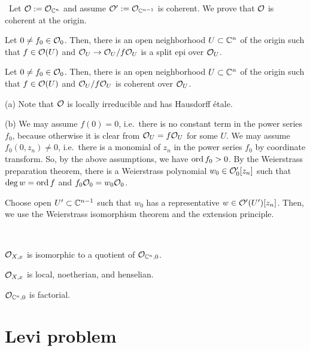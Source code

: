 \documentclass{../../large}
\begin{document}
\begin{prb}
\end{prb}


\begin{prb}\,
Let $\mathcal{O}:=\mathcal{O}_{\mathbb{C}^n}$ and assume $\mathcal{O}':=\mathcal{O}_{\mathbb{C}^{n-1}}$ is coherent.
We prove that $\mathcal{O}$ is coherent at the origin.
\begin{parts}
\item Let $0\ne f_0\in\mathcal{O}_0$. Then, there is an open neighborhood $U\subset\mathbb{C}^n$ of the origin such that $f\in\mathcal{O}(U)$ and $\mathcal{O}_U\to\mathcal{O}_U/f\mathcal{O}_U$ is a split epi over $\mathcal{O}_U$.
\item Let $0\ne f_0\in\mathcal{O}_0$. Then, there is an open neighborhood $U\subset\mathbb{C}^n$ of the origin such that $f\in\mathcal{O}(U)$ and $\mathcal{O}_U/f\mathcal{O}_U$ is coherent over $\mathcal{O}_U$.
\end{parts}
\end{prb}
\begin{pf}
(a)
Note that $\mathcal{O}$ is locally irreducible and has Hausdorff \'etale.

(b)
We may assume $f(0)=0$, i.e.~there is no constant term in the power series $f_0$, because otherwise it is clear from $\mathcal{O}_U=f\mathcal{O}_U$ for some $U$.
We may assume $f_0(0,z_n)\ne0$, i.e.~there is a monomial of $z_n$ in the power series $f_0$ by coordinate transform.
So, by the above assumptions, we have $\operatorname{ord} f_0>0$.
By the Weierstrass preparation theorem, there is a Weierstrass polynomial $w_0\in\mathcal{O}'_0[z_n]$ such that $\deg w=\operatorname{ord} f$ and $f_0\mathcal{O}_0=w_0\mathcal{O}_0$.

Choose open $U'\subset\mathbb{C}^{n-1}$ such that $w_0$ has a representative $w\in\mathcal{O}'(U')[z_n]$.
Then, we use the Weierstrass isomorphism theorem and the extension principle.


\end{pf}


\begin{prb}\,
\begin{parts}
\item $\mathcal{O}_{X,x}$ is isomorphic to a quotient of $\mathcal{O}_{\mathbb{C}^n,0}$.
\item $\mathcal{O}_{X,x}$ is local, noetherian, and henselian.
\item $\mathcal{O}_{\mathbb{C}^n,0}$ is factorial.
\end{parts}
\end{prb}


\section{Levi problem}
\end{document}
